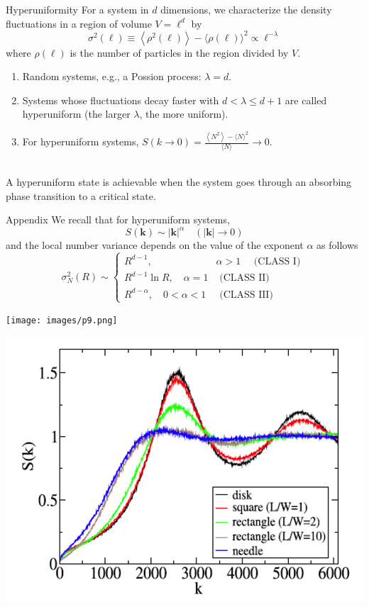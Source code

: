\documentclass{bredelebeamer}
\begin{document}
\begin{frame}{Hyperuniformity}
\setlength{\parindent}{2em}For a system in $d$ dimensions, we characterize the
density fluctuations in a region of volume $V=\ell^{d}$ by
$$\sigma^{2}(\ell) \equiv\left\langle\rho^{2}(\ell)\right\rangle-\langle\rho(\ell)\rangle^{2} \propto \ell^{-\lambda}$$
where $\rho(\ell)$ is the number of particles in the region divided by $V$.
\newline\
\begin{enumerate}[]
\item Random systems, e.g., a Possion process: $\lambda=d$.
\item Systems whose fluctuations decay faster with $d<\lambda \leq d+1$ are called hyperuniform (the larger $\lambda$, the more uniform).
\item For hyperuniform systems,
$S(k \rightarrow 0)=\frac{\left\langle N^{2}\right\rangle-\langle N\rangle^{2}}{\langle N\rangle} \rightarrow 0$.
\end{enumerate}
\
\newline\\
A hyperuniform state is achievable when the system goes through an absorbing phase transition to a critical state.
\end{frame}

\begin{frame}{Appendix}
\setlength{\parindent}{2em}We recall that for hyperuniform systems, 
$$S(\mathbf{k}) \sim|\mathbf{k}|^{\alpha} \quad(|\mathbf{k}| \rightarrow 0)$$
and the local number variance depends on the value of the exponent $\alpha$ as follows
$$\sigma_{N}^{2}(R) \sim \begin{cases}R^{d-1}, & \alpha>1 \quad \text { (CLASS I) } \\ R^{d-1} \ln R, \quad \alpha=1 & \text { (CLASS II) } \\ R^{d-\alpha}, \quad 0<\alpha<1 & \text { (CLASS III) }\end{cases}$$

\columnseprule=1pt         %
\begin{multicols}{2} %
\centerline{\texttt{[image: images/p9.png]}}
\centerline{\includegraphics[scale=0.18]{images/p10.png}}
\end{multicols}

\end{frame}
\end{document}
